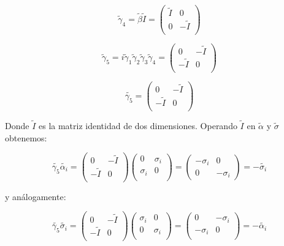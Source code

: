 \documentclass[a4paper, 12pt]{article} %
\begin{document}
\[
\widetilde{\gamma}_4 = \widetilde{\beta}\widetilde{I} = 
\begin{pmatrix}
\widetilde{I} & 0 \\
0 & -\widetilde{I}  \\
\end{pmatrix}
\]

\begin{equation}\label{eq:gamma5}
\widetilde{\gamma}_5 = i\widetilde{\gamma}_1 \widetilde{\gamma}_2 \widetilde{\gamma}_3 \widetilde{\gamma}_4 = 
\begin{pmatrix}
0 & -\widetilde{I} \\
-\widetilde{I} & 0 \\
\end{pmatrix}
\end{equation}


\[
\widetilde{\gamma_5} = 
\begin{pmatrix} 
0 & - \widetilde{I} \\
-\widetilde{I} & 0 \\
\end{pmatrix}
\]

Donde $\widetilde{I}$ es la matriz identidad de dos dimensiones. Operando  $\widetilde{I}$ 
en $\widetilde{\alpha}$ y $\widetilde{\sigma}$ obtenemos:

\[
\widetilde{\gamma_5}\widetilde{\alpha_i} = 
\begin{pmatrix} 
0 & - \widetilde{I} \\
-\widetilde{I} & 0 \\
\end{pmatrix} 
\begin{pmatrix} 
0 & \sigma_i \\
\sigma_i & 0 \\
\end{pmatrix} 
= 
\begin{pmatrix}
-\sigma_i & 0 \\
0 & -\sigma_i
\end{pmatrix}
= -\widetilde{\sigma_i}
\]

y an\'alogamente:

\[
\widetilde{\gamma_5}\widetilde{\sigma_i} = 
\begin{pmatrix} 
0 & - \widetilde{I} \\
-\widetilde{I} & 0 \\
\end{pmatrix} 
\begin{pmatrix} 
\sigma_i & 0 \\
0 & \sigma_i  \\
\end{pmatrix} 
= 
\begin{pmatrix}
0 & -\sigma_i \\
-\sigma_i & 0 \\
\end{pmatrix}
= -\widetilde{\alpha_i}
\]
\end{document}
